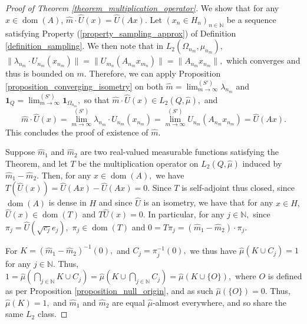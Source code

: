 \documentclass[10pt,a4paper]{amsart}
\def \Dom{\operatorname{dom}}
\def \HMU{\hat{\mu}}
\def \HU{\hat{U}}
\def \Hm{\hat{m}}
\begin{document}
\begin{proof}[Proof of Theorem \ref{theorem_multiplication_operator}]
	We show that for any $x\in\Dom(A)$, $\Hm\cdot\HU(x)=\HU(Ax).$ Let $(x_n\in H_n)_{n\in\mathbb{N}}$ be a sequence satisfying Property (\ref{property_sampling_approx}) of Definition \ref{definition_sampling}. We then note that in $L_2(\Omega_{n_m},\mu_{n_m}),$ $\|\lambda_{n_m}\cdot U_{n_m}(x_{n_m})\|=\|U_{m_n}(A_{n_m}x_{m_n})\|=\|A_{n_m}x_{n_m}\|,$ which converges and thus is bounded on $m$. Therefore, we can apply Proposition \ref{proposition_converging_isometry} on both $\Hm=\lim^{(S')}_{m\rightarrow\infty} \lambda_{n_m}$ and $\mathbf{1}_Q=\lim^{(S')}_{m\rightarrow\infty}\mathbf{1}_{\Omega_{n_m}},$ so that $\Hm\cdot \HU(x)\in L_2(Q,\HMU),$ and $$\Hm\cdot\HU(x)={\lim}^{(S')}_{m\rightarrow\infty} \lambda_{n_m}\cdot U_{n_m}(x_{n_m})={\lim}^{(S')}_{m\rightarrow\infty}U_{n_m}(A_{n_m}x_{n_m})=\HU(Ax). $$ This concludes the proof of existence of $\Hm$.
	
	Suppose $\Hm_1$ and $\Hm_2$ are two real-valued measurable functions satisfying the Theorem, and let $T$ be the multiplication operator on $L_2(Q,\HMU)$ induced by $\Hm_1-\Hm_2$. Then, for any $x\in\Dom(A),$  we have $T(\HU(x))=\HU(Ax)-\HU(Ax)=0$. Since $T$ is self-adjoint thus closed, since $\Dom(A)$ is dense in $H$ and since $\HU$ is an isometry, we have that for any $x\in H,$ $\HU(x)\in\Dom(T)$ and $T\HU(x)=0.$ In particular, for any $j\in\mathbb{N},$ since $\pi_j=\HU(\sqrt{c_j}e_j),$ $\pi_j\in\Dom(T)$ and $0=T\pi_j=(\Hm_1-\Hm_2)\cdot\pi_j.$  
	
	For $K=(\Hm_1-\Hm_2)^{-1}(0),$ and $C_j=\pi_j^{-1}(0),$ we thus have $\HMU(K\cup C_j)=1$ for any $j\in\mathbb{N}.$ Thus, $1=\HMU(\bigcap_{j\in\mathbb{N}} K\cup C_j)=\HMU(K\cup\bigcap_{j\in\mathbb{N}}C_j)=\HMU(K\cup\{O\}),$ where $O$ is defined as per Proposition \ref{proposition_null_origin}, and as such $\HMU(\{O\})=0$. Thus, $\HMU(K)=1,$ and $\Hm_1$ and $\Hm_2$ are equal $\HMU$-almost everywhere, and so share the same $L_2$ class.
\end{proof}
\end{document}

